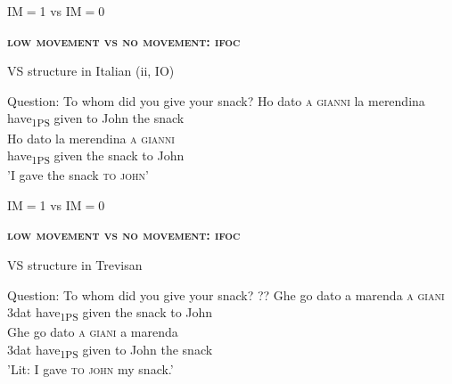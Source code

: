 \documentclass[lesson_slides]{subfiles}
\begin{document}
\begin{frame}[c]{IM$=$1 vs IM$=$0}

    \noindent \textbf{\textsc{low movement vs no movement: ifoc}}

    \begin{exe}
     VS structure in Italian (ii, IO) \pause
        \begin{xlist}
            \ex Question: To whom did you give your snack? \pause
            \ex \gll * Ho dato \textsc{a} \textsc{gianni} la merendina\\
            {} have\textsubscript{1PS} given to John the snack\\ \pause 
            \ex \gll Ho dato la merendina \textsc{a} \textsc{gianni}\\ 
            have\textsubscript{1PS} given the snack to John\\
            \glt 'I gave the snack \textsc{to} \textsc{john}'
        \end{xlist}
    \end{exe}

\end{frame}
\begin{frame}[c]{IM$=$1 vs IM$=$0}

    \noindent \textbf{\textsc{low movement vs no movement: ifoc}}

    \begin{exe}
        \ex VS structure in Trevisan \pause
            \begin{xlist}
                \ex Question: To whom did you give your snack? \pause
                \ex \gll ?? Ghe go dato a marenda \textsc{a} \textsc{giani}\\
                {} 3dat have\textsubscript{1PS} given the snack to John\\ \pause
                \ex \gll Ghe go dato \textsc{a} \textsc{giani} a marenda\\
                3dat have\textsubscript{1PS} given to John the snack\\
                \glt 'Lit: I gave \textsc{to} \textsc{john} my snack.'
            \end{xlist}
    \end{exe}

\end{frame}
\end{document}
